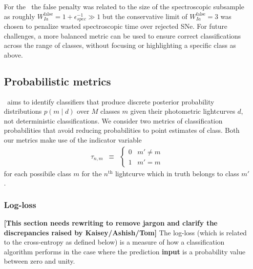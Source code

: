 For the \snphotcc\ the false penalty was related to the size of the spectroscopic subsample as roughly $W_{Ia}^\mathrm{false} = 1 + \epsilon_{spec}^{-1} \gg 1$ but the conservative limit of $W_{Ia}^\mathrm{false} = 3$ was chosen to penalize wasted spectroscopic time over rejected SNe.
For future challenges, a more balanced metric can be used to ensure correct classifications across the range of classes, without focusing or highlighting a specific class as above.



\subsection{Probabilistic metrics}
\label{sec:probabilistic}

\plasticc\ aims to identify classifiers that produce discrete posterior probability distributions $p(m \mid d)$ over $M$ classes $m$ given their photometric lightcurves $d$, not deterministic classifications.
We consider two metrics of classification probabilities that avoid reducing probabilities to point estimates of class.
Both our metrics make use of the indicator variable
\begin{eqnarray}
  \label{eq:indicator}
  \tau_{n, m} &\equiv& \begin{cases}
  0 & m' \neq m\\
  1 & m' = m
  \end{cases}
\end{eqnarray}
for each possibile class $m$ for the $n^{\mathrm{th}}$ lightcurve which in truth belongs to class $m'$.

\subsubsection{Log-loss}
\label{sec:logloss}

\textbf{[This section needs rewriting to remove jargon and clarify the discrepancies raised by Kaisey/Ashish/Tom]}
The log-loss (which is related to the cross-entropy as defined below) is a measure of how a classification algorithm performs in the case where the prediction \textbf{input} is a probability value between zero and unity.

